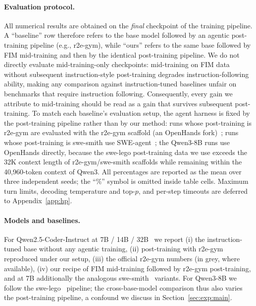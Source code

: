 \paragraph{Evaluation protocol.}
All numerical results are obtained on the \emph{final} checkpoint of the
training pipeline. A ``baseline'' row therefore refers to the base model
followed by an agentic post-training pipeline (e.g., r2e-gym), while ``ours''
refers to the same base followed by FIM mid-training and then by the
identical post-training pipeline. We do not directly evaluate
mid-training-only checkpoints: mid-training on FIM data without subsequent
instruction-style post-training degrades instruction-following ability,
making any comparison against instruction-tuned baselines unfair on
benchmarks that require instruction following. Consequently, every gain we
attribute to mid-training should be read as a gain that survives subsequent
post-training. To match each baseline's evaluation setup, the agent
harness is fixed by the post-training pipeline rather than by our method:
runs whose post-training is r2e-gym are evaluated with the r2e-gym scaffold
(an OpenHands fork)~\citep{openhands, r2egym}; runs whose
post-training is swe-smith use SWE-agent~\citep{sweagent}; the Qwen3-8B
runs use OpenHands directly, because the swe-lego post-training data we use
exceeds the 32K context length of r2e-gym/swe-smith scaffolds while
remaining within the 40{,}960-token context of Qwen3.
All percentages are reported as the mean over three independent seeds; the
``\%'' symbol is omitted inside table cells. Maximum turn limits, decoding
temperature and top-$p$, and per-step timeouts are deferred to
Appendix~\ref{app:hp}.

\paragraph{Models and baselines.}
For Qwen2.5-Coder-Instruct at 7B / 14B / 32B~\citep{qwencoder} we
report (i) the instruction-tuned base without any agentic training,
(ii) post-training with r2e-gym reproduced under our setup, (iii) the
official r2e-gym numbers (in grey, where available), (iv) our recipe of
FIM mid-training followed by r2e-gym post-training, and at 7B additionally
the analogous swe-smith~\citep{swesmith} variants. For Qwen3-8B we
follow the swe-lego~\citep{swelego} pipeline; the cross-base-model
comparison thus also varies the post-training pipeline, a confound we
discuss in Section~\ref{sec:exp:main}.


